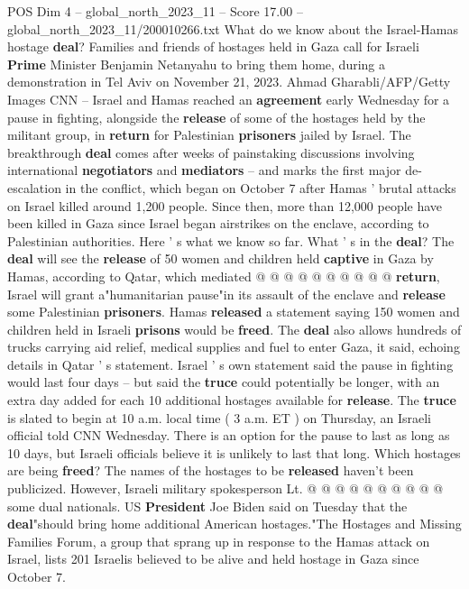 \begin{textsample}{POS Dim 4 – global\_north\_2023\_11 – Score 17.00 – global\_north\_2023\_11/200010266.txt}  \label{ex:f4_pos_209}
What do we know about the Israel-Hamas hostage \textbf{deal}?
Families and friends of hostages held in Gaza call for Israeli \textbf{Prime} Minister Benjamin Netanyahu to bring them home, during a demonstration in Tel Aviv on November 21, 2023.
Ahmad Gharabli/AFP/Getty Images CNN -- Israel and Hamas reached an \textbf{agreement} early Wednesday for a pause in fighting, alongside the \textbf{release} of some of the hostages held by the militant group, in \textbf{return} for Palestinian \textbf{prisoners} jailed by Israel.
The breakthrough \textbf{deal} comes after weeks of painstaking discussions involving international \textbf{negotiators} and \textbf{mediators} -- and marks the first major de-escalation in the conflict, which began on October 7 after Hamas ' brutal attacks on Israel killed around 1,200 people.
Since then, more than 12,000 people have been killed in Gaza since Israel began airstrikes on the enclave, according to Palestinian authorities.
Here ' s what we know so far.
What ' s in the \textbf{deal}?
The \textbf{deal} will see the \textbf{release} of 50 women and children held \textbf{captive} in Gaza by Hamas, according to Qatar, which mediated @ @ @ @ @ @ @ @ @ @ \textbf{return}, Israel will grant a"humanitarian pause"in its assault of the enclave and \textbf{release} some Palestinian \textbf{prisoners}.
Hamas \textbf{released} a statement saying 150 women and children held in Israeli \textbf{prisons} would be \textbf{freed}.
The \textbf{deal} also allows hundreds of trucks carrying aid relief, medical supplies and fuel to enter Gaza, it said, echoing details in Qatar ' s statement.
Israel ' s own statement said the pause in fighting would last four days -- but said the \textbf{truce} could potentially be longer, with an extra day added for each 10 additional hostages available for \textbf{release}.
The \textbf{truce} is slated to begin at 10 a.m. local time ( 3 a.m.
ET ) on Thursday, an Israeli official told CNN Wednesday.
There is an option for the pause to last as long as 10 days, but Israeli officials believe it is unlikely to last that long.
Which hostages are being \textbf{freed}?
The names of the hostages to be \textbf{released} haven't been publicized.
However, Israeli military spokesperson Lt. @ @ @ @ @ @ @ @ @ @ some dual nationals.
US \textbf{President} Joe Biden said on Tuesday that the \textbf{deal}"should bring home additional American hostages."The Hostages and Missing Families Forum, a group that sprang up in response to the Hamas attack on Israel, lists 201 Israelis believed to be alive and held hostage in Gaza since October 7.

\end{textsample}
